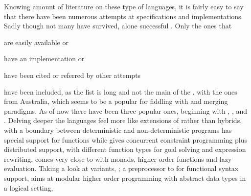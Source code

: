\documentclass[thesis-solanki.tex]{subfiles}
\begin{document}
Knowing   amount of literature  on these type of languages, it is fairly easy to say that there have been numerous 
attempts at specifications and implementations.
Sadly though\yyy{}{\Large,} not many have survived,  alone  successful   .
Only the ones that
\begin{inparaenum}[(a)]
\item
  are easily available or
\item
  have an implementation or
\item
  have been cited or referred by other attempts
\end{inparaenum}
have been included, as the list is long and  not  the main  of the .
with the ones from Australia, which seems to be a popular  for fiddling with
 and merging paradigms.
As of now there have been three popular ones, beginning with , \cite{website:nue-prolog},
 \cite{website:oz-mozart} and  \cite{website:mercury}.
Delving deeper\yyy{}{\Large,} the languages feel more like extensions of  rather than hybrids.
 with   a boundary between deterministic and
non-deterministic programs
has special support for functions\yyy{}{\Large,} while  gives concurrent constraint programming
plus distributed support, with different function types for goal solving and expression rewriting.
 \cite{lloyd1999programming:escher} comes very close to  with monads, higher
order functions and lazy evaluation.
Taking a look at  variants,  \cite{website:ciao}; a preprocessor to
 for functional syntax support,  \cite{website:lambda-prolog} aims at
modular higher order programming with abstract data types in a logical setting, 
\end{document}
